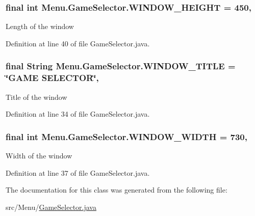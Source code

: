 \hypertarget{class_menu_1_1_game_selector_a5db86c0bf9d31a994749afa8f19a49f5}{}
\subsubsection[{W\+I\+N\+D\+O\+W\+\_\+\+H\+E\+I\+G\+H\+T}]{\setlength{\rightskip}{0pt plus 5cm}final int Menu.\+Game\+Selector.\+W\+I\+N\+D\+O\+W\+\_\+\+H\+E\+I\+G\+H\+T = 450\hspace{0.3cm}{\ttfamily [static]}, {\ttfamily [private]}}\label{class_menu_1_1_game_selector_a5db86c0bf9d31a994749afa8f19a49f5}
Length of the window 

Definition at line 40 of file Game\+Selector.\+java.

\hypertarget{class_menu_1_1_game_selector_a8170d86254d9973a3c7039dfe166c563}{}
\subsubsection[{W\+I\+N\+D\+O\+W\+\_\+\+T\+I\+T\+L\+E}]{\setlength{\rightskip}{0pt plus 5cm}final String Menu.\+Game\+Selector.\+W\+I\+N\+D\+O\+W\+\_\+\+T\+I\+T\+L\+E = \char`\"{}G\+A\+M\+E S\+E\+L\+E\+C\+T\+O\+R\char`\"{}\hspace{0.3cm}{\ttfamily [static]}, {\ttfamily [private]}}\label{class_menu_1_1_game_selector_a8170d86254d9973a3c7039dfe166c563}
Title of the window 

Definition at line 34 of file Game\+Selector.\+java.

\hypertarget{class_menu_1_1_game_selector_a43fb0db61ebb9549be82751cb984e371}{}
\subsubsection[{W\+I\+N\+D\+O\+W\+\_\+\+W\+I\+D\+T\+H}]{\setlength{\rightskip}{0pt plus 5cm}final int Menu.\+Game\+Selector.\+W\+I\+N\+D\+O\+W\+\_\+\+W\+I\+D\+T\+H = 730\hspace{0.3cm}{\ttfamily [static]}, {\ttfamily [private]}}\label{class_menu_1_1_game_selector_a43fb0db61ebb9549be82751cb984e371}
Width of the window 

Definition at line 37 of file Game\+Selector.\+java.



The documentation for this class was generated from the following file\+:\begin{DoxyCompactItemize}
\item 
src/\+Menu/\hyperlink{_game_selector_8java}{Game\+Selector.\+java}\end{DoxyCompactItemize}

